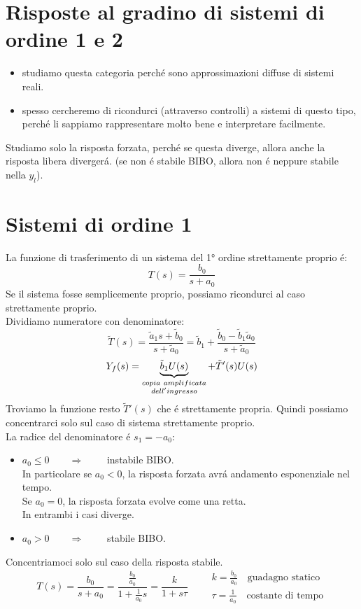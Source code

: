 \documentclass[../main.tex]{subfiles}
\begin{document}
	\section{Risposte al gradino di sistemi di ordine 1 e 2}
	\begin{itemize}
		\item studiamo questa categoria perch\'e sono approssimazioni diffuse di sistemi reali.
		\item spesso cercheremo di ricondurci (attraverso controlli) a sistemi di questo tipo, perch\'e li sappiamo rappresentare molto bene e interpretare facilmente.
	\end{itemize}
	Studiamo solo la risposta forzata, perch\'e se questa diverge, allora anche la risposta libera diverger\'a. (se non \'e stabile BIBO, allora non \'e neppure stabile nella $ y_l $).\\
	\section{Sistemi di ordine 1}	
	La funzione di trasferimento di un sistema del 1° ordine strettamente proprio \'e:
	\[ T(s) = \frac{b_0}{s+a_0} \]
	Se il sistema fosse semplicemente proprio, possiamo ricondurci al caso strettamente proprio.\\
	Dividiamo numeratore con denominatore:
	\[ \tilde T(s) = \frac{\tilde a_1s + \tilde b_0}{s+\tilde a_0} = \tilde b_1 + \frac{\tilde b_0 - \tilde b_1 \tilde a_0}{s+\tilde a_0} \]
	\[ Y_f(s) = \underbrace{\tilde b_1 U(s)}_{\begin{subarray} ccopia\ amplificata\\ dell'ingresso \end{subarray}} + \tilde T'(s)U(s) \]
	Troviamo la funzione resto $ \tilde T'(s) $ che \'e strettamente propria. Quindi possiamo concentrarci solo sul caso di sistema strettamente proprio.\\
	La radice del denominatore \'e $ s_1 = -a_0 $:
	\begin{itemize}
		\item $ a_0 \leq 0 \qquad \Rightarrow \qquad $ instabile BIBO.\\
		In particolare se $ a_0 < 0 $, la risposta forzata avr\'a andamento esponenziale nel tempo.\\
		Se $ a_0 = 0 $, la risposta forzata evolve come una retta.\\
		In entrambi i casi diverge.
		\item $ a_0 > 0 \qquad \Rightarrow \qquad $ stabile BIBO.
	\end{itemize} 
	Concentriamoci solo sul caso della risposta stabile.\\
	\[ T(s) = \frac{b_0}{s+a_0} = \frac{\frac{b_0}{a_0}}{1+\frac{1}{a_0}s} = \frac{k}{1+s \tau} \qquad \begin{array}{l} k = \frac{b_0}{a_0} \quad \text{guadagno statico} \\ \tau = \frac{1}{a_0} \quad \text{costante di tempo} \end{array}\]
\end{document}
